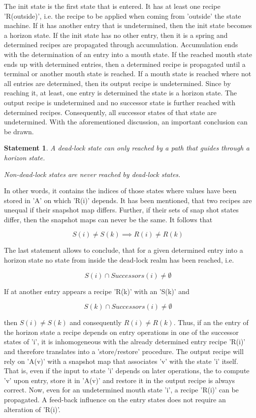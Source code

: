 \documentclass[12pt]{article}
\newtheorem{statement}{Statement}
\begin{document}
The init state is the first state that is entered. It has at least one recipe
'R(outside)', i.e. the recipe to be applied when coming from 'outside' the
state machine. If it has another entry that is undetermined, then the init
state becomes a horizon state. If the init state has no other entry, then it is
a spring and determined recipes are propagated through accumulation.
Accumulation ends with the determination of an entry into a mouth state. If the
reached mouth state ends up with determined entries, then a determined recipe
is propagated until a terminal or another mouth state is reached. If a mouth
state is reached where not all entries are determined, then its output recipe
is undetermined. Since by reaching it, at least, one entry is determined the
state is a horizon state. The output recipe is undetermined and no successor
state is further reached with determined recipes. Consequently, all successor
states of that state are undetermined.  With the aforementioned discussion, an
important conclusion can be drawn.

\begin{statement}
   A dead-lock state can only reached by a path that guides through a horizon
   state. 
   
   Non-dead-lock states are never reached by dead-lock states.
\end{statement}
   
In other words, it contains the indices of those states where values have been
stored in 'A' on which 'R(i)' depends. It has been mentioned, that two recipes
are unequal if their snapshot map differs. Further, if their sets of snap shot
states differ, then the snapshot maps can never be the same. It follows that

\[
                   S(i) \neq S(k) \implies R(i) \neq R(k)
\]

The last statement allows to conclude, that for a given determined entry into a
horizon state no state from inside the dead-lock realm has been reached, i.e.

\[
              S(i) \cap Successors(i) \neq \emptyset
\]

If at another entry appears a recipe 'R(k)' with an 'S(k)' and 

\[
              S(k) \cap Successors(i) \neq \emptyset
\]

then \(S(i) \neq S(k)\) and consequently \(R(i) \neq R(k)\). Thus, if an the entry of
the horizon state a recipe depends on entry operations in one of the successor
states of 'i', it is inhomogeneous with the already determined entry recipe
'R(i)' and therefore translates into a 'store/restore' procedure. The output
recipe will rely on 'A(v)' with a snapshot map that associates 'v' with the
state 'i' itself. That is, even if the input to state 'i' depends on later
operations, the to compute 'v' upon entry, store it in 'A(v)' and restore it in
the output recipe is always correct. Now, even for an undetermined mouth state
'i', a recipe 'R(i)' can be propagated.  A feed-back influence on the entry
states does not require an alteration of 'R(i)'.
\end{document}
